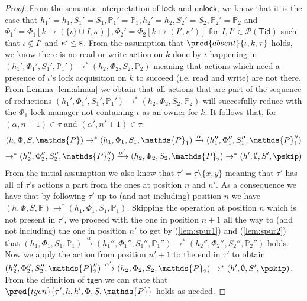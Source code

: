\begin{lem}
\begin{proof}
	From the semantic interpretation of $\mathsf{lock}$ and $\mathsf{unlock}$, we know that it is the case that $h_1' = h_1, S_1' = S_1, \mathds{P}_1' = \mathds{P}_1, h_2' = h_2, S_2' = S_2, \mathds{P}_2' = \mathds{P}_2$ and $\Phi_1' = \Phi_1[k \mapsto (\{\iota\} \cup I, \kappa)], \Phi_2' = \Phi_2[k \mapsto (I', \kappa')]$ for $I, I' \in \mathcal{P}(\mathsf{Tid})$ such that $\iota \not\in I'$ and $\kappa' \leq \textsc{s}$. From the assumption that $\pred{absent}{\iota, k, \tau}$ holds, we know there is no read or write action on $k$ done by $\iota$ happening in $(h_1', \Phi_1', S_1', \mathds{P}_1') \rightarrow^* (h_2, \Phi_2, S_2, \mathds{P}_2)$ meaning that actions which need a presence of $\iota$'s lock acquisition on $k$ to succeed (i.e. read and write) are not there. From Lemma \ref{lem:alman} we obtain that all actions that are part of the sequence of reductions $(h_1', \Phi_1', S_1', \mathds{P}_1') \rightarrow^* (h_2, \Phi_2, S_2, \mathds{P}_2)$ will succesfully reduce with the $\Phi_1$ lock manager not containing $\iota$ as an owner for $k$. It follows that, for $(\alpha, n+1) \in \tau$ and $(\alpha', n'+1) \in \tau$:
	\begin{gather}
		\label{lem:spur1} (h, \Phi, S, \mathds{P}) \rightarrow^* (h_1, \Phi_1, S_1, \mathds{P}_1) \xrightarrow{\alpha} (h_1'', \Phi_1'', S_1'', \mathds{P}_1'')
			\\
		\label{lem:spur2} \rightarrow^* (h_2'', \Phi_2'', S_2'',\mathds{P}_2'') \xrightarrow{\alpha'} (h_2, \Phi_2, S_2, \mathds{P}_2) \rightarrow^* (h', \emptyset, S', \pskip)
	\end{gather}
	From the initial assumption we also know that $\tau' = \tau \setminus \{ x, y \}$ meaning that $\tau'$ has all of $\tau$'s actions a part from the ones at position $n$ and $n'$. As a consequence we have that by following $\tau'$ up to (and not including) position $n$ we have $(h, \Phi, S, \mathds{P}) \rightarrow^* (h_1, \Phi_1, S_1, \mathds{P}_1)$. Skipping the operation at position $n$ which is not present in $\tau'$, we proceed with the one in position $n + 1$ all the way to (and not including) the one in position $n'$ to get by (\ref{lem:spur1}) and (\ref{lem:spur2}) that $(h_1, \Phi_1, S_1, \mathds{P}_1) \xrightarrow{\alpha} (h_1'', \Phi_1'', S_1'', \mathds{P}_1'') \rightarrow^* (h_2'', \Phi_2'', S_2'',\mathds{P}_2'')$ holds. Now we apply the action from position $n' + 1$ to the end in $\tau'$ to obtain $(h_2'', \Phi_2'', S_2'',\mathds{P}_2'') \xrightarrow{\alpha'} (h_2, \Phi_2, S_2, \mathds{P}_2) \rightarrow^* (h', \emptyset, S', \pskip)$. From the definition of $\mathsf{tgen}$ we can state that $\pred{tgen}{\tau', h, h', \Phi, S, \mathds{P}}$ holds as needed.
	\end{proof}
\end{lem}

